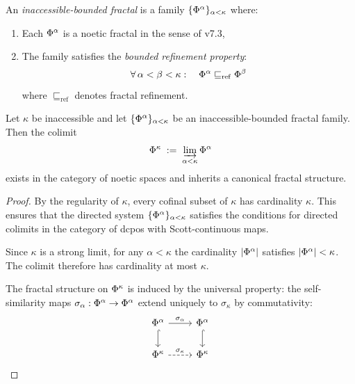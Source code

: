 \begin{definition}
\label{def:inacc-fractal}
An \emph{inaccessible-bounded fractal} is a family
$\{\Phi^{\alpha}\}_{\alpha < \kappa}$ where:
\begin{enumerate}[label=(\roman*)]
    \item Each $\Phi^{\alpha}$ is a noetic fractal in the sense of v7.3,
    \item The family satisfies the \emph{bounded refinement property}:
    \[
        \forall\, \alpha < \beta < \kappa: \quad
        \Phi^{\alpha} \sqsubseteq_{\mathrm{ref}} \Phi^{\beta}
    \]
    where $\sqsubseteq_{\mathrm{ref}}$ denotes fractal refinement.
\end{enumerate}
\end{definition}

\begin{theorem}
\label{thm:inacc-closure}
Let $\kappa$ be inaccessible and let $\{\Phi^{\alpha}\}_{\alpha < \kappa}$
be an inaccessible-bounded fractal family. Then the colimit
\[
    \Phi^{\kappa} \;:=\; \varinjlim_{\alpha < \kappa} \Phi^{\alpha}
\]
exists in the category of noetic spaces and inherits a canonical fractal
structure.
\end{theorem}

\begin{proof}
By the regularity of $\kappa$, every cofinal subset of $\kappa$ has
cardinality $\kappa$. This ensures that the directed system
$\{\Phi^{\alpha}\}_{\alpha < \kappa}$ satisfies the conditions for
directed colimits in the category of dcpos with Scott-continuous maps.

Since $\kappa$ is a strong limit, for any $\alpha < \kappa$ the cardinality
$|\Phi^{\alpha}|$ satisfies $|\Phi^{\alpha}| < \kappa$. The colimit
therefore has cardinality at most $\kappa$.

The fractal structure on $\Phi^{\kappa}$ is induced by the universal
property: the self-similarity maps $\sigma_\alpha: \Phi^{\alpha} \to
\Phi^{\alpha}$ extend uniquely to $\sigma_\kappa$ by commutativity:
\[
\begin{tikzcd}
    \TransFrac{\alpha} \arrow[r, "\sigma_\alpha"] \arrow[d, hook] &
    \TransFrac{\alpha} \arrow[d, hook] \\
    \TransFrac{\kappa} \arrow[r, dashed, "\sigma_\kappa"] &
    \TransFrac{\kappa}
\end{tikzcd}
\]
\end{proof}


